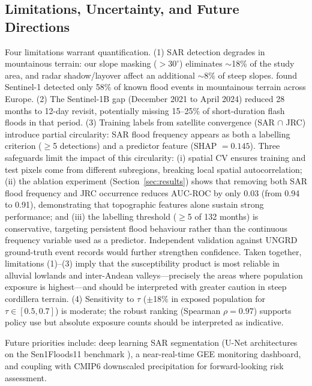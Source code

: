 \documentclass{article}
\begin{document}
\subsection{Limitations, Uncertainty, and Future Directions}
\label{sec:limitations}

Four limitations warrant quantification. (1) SAR detection degrades in mountainous terrain: our slope masking ($>30^{\circ}$) eliminates $\sim$18\% of the study area, and radar shadow/layover affect an additional $\sim$8\% of steep slopes. \citet{Tarpanelli2022} found Sentinel-1 detected only 58\% of known flood events in mountainous terrain across Europe. (2) The Sentinel-1B gap (December 2021 to April 2024) reduced 28 months to 12-day revisit, potentially missing 15--25\% of short-duration flash floods in that period. (3) Training labels from satellite convergence (SAR $\cap$ JRC) introduce partial circularity: SAR flood frequency appears as both a labelling criterion ($\geq$5 detections) and a predictor feature (SHAP $= 0.145$). Three safeguards limit the impact of this circularity: (i) spatial CV ensures training and test pixels come from different subregions, breaking local spatial autocorrelation; (ii) the ablation experiment (Section~\ref{sec:results}) shows that removing both SAR flood frequency and JRC occurrence reduces AUC-ROC by only 0.03 (from 0.94 to 0.91), demonstrating that topographic features alone sustain strong performance; and (iii) the labelling threshold ($\geq$5 of 132 months) is conservative, targeting persistent flood behaviour rather than the continuous frequency variable used as a predictor. Independent validation against UNGRD ground-truth event records would further strengthen confidence. Taken together, limitations (1)--(3) imply that the susceptibility product is most reliable in alluvial lowlands and inter-Andean valleys---precisely the areas where population exposure is highest---and should be interpreted with greater caution in steep cordillera terrain. (4) Sensitivity to $\tau$ ($\pm$18\% in exposed population for $\tau \in [0.5, 0.7]$) is moderate; the robust ranking (Spearman $\rho = 0.97$) supports policy use but absolute exposure counts should be interpreted as indicative.

Future priorities include: deep learning SAR segmentation (U-Net architectures on the Sen1Floods11 benchmark \citep{Bonafilia2020}), a near-real-time GEE monitoring dashboard, and coupling with CMIP6 downscaled precipitation for forward-looking risk assessment.

\end{document}
